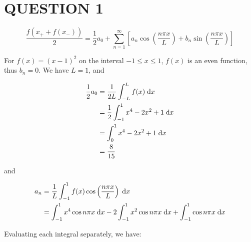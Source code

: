 \documentclass[a4paper]{article}
\begin{document}
	
\maketitle

\section{QUESTION 1}

\[ \frac{f(x_{+} + f(x_{-}))}{2} = \frac{1}{2} a_{0} + \sum_{n=1}^{\infty} \left[ a_{n} \cos \left( \frac{n \pi x}{L} \right) + b_{n} \sin \left( \frac{n \pi x}{L} \right)  \right]  \]

For $ f(x) = (x-1)^{2} $ on the interval $ -1 \leq x \leq 1 $, $ f(x) $ is an even function, thus $ b_{n} = 0 $. We have $ L = 1 $, and 

\begin{align*}
\frac{1}{2} a_{0} & = \frac{1}{2L} \int_{-L}^{L} f(x) \; \mathrm{d} x \\
& = \frac{1}{2} \int_{-1}^{1} x^{4} - 2x^{2} + 1 \; \mathrm{d} x \\
& = \int_{0}^{1} x^{4} - 2x^{2} + 1 \; \mathrm{d} x \\
& = \frac{8}{15}
\end{align*}

and

\begin{align*}
a_{n} & = \frac{1}{L} \int_{-1}^{1} f(x) \cos \left( \frac{n \pi x}{L} \right) \; \mathrm{d} x   \\
& = \int_{-1}^{1} x^{4} \cos  n \pi x  \; \mathrm{d} x - 2 \int_{-1}^{1} x^{2} \cos  n \pi x   \; \mathrm{d} x + \int_{-1}^{1} \cos  n \pi x   \; \mathrm{d} x
\end{align*}

Evaluating each integral separately, we have:
\end{document}
